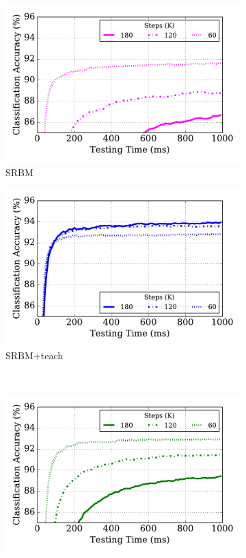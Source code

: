 \begin{figure}
	\centering
	\begin{subfigure}[t]{0.4\textwidth}
		\includegraphics[width=\textwidth]{pics_sdlm/50_MNIST_SRBM_original/latency.pdf}
		\caption{SRBM}
	\end{subfigure}
	\begin{subfigure}[t]{0.4\textwidth}
		\includegraphics[width=\textwidth]{pics_sdlm/51_MNIST_SRBM_teach/latency.pdf}
		\caption{SRBM+teach}
	\end{subfigure}\\
	\begin{subfigure}[t]{0.4\textwidth}
		\includegraphics[width=\textwidth]{pics_sdlm/52_MNIST_SRBM_noise/latency.pdf}

\end{subfigure}
\end{figure}
